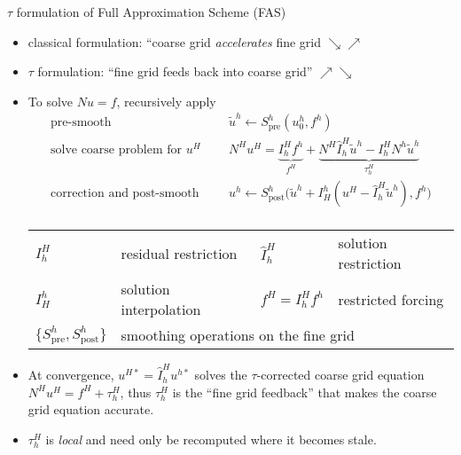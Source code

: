 \begin{frame}{$\tau$ formulation of Full Approximation Scheme (FAS)}
  \begin{itemize}
  \item classical formulation: ``coarse grid \emph{accelerates} fine grid $\searrow \nearrow$
  \item $\tau$ formulation: ``fine grid feeds back into coarse grid'' $\nearrow \searrow$
  \item To solve $N u = f$, recursively apply
    \begin{equation*}
      \begin{split}
        \text{pre-smooth} \:\: & \quad \tilde u^h \gets S^h_{\text{pre}}(u^h_0, f^h) \\
        \text{solve coarse problem for $u^H$} \:\: & \quad N^H u^H = \underbrace{I_h^H f^h}_{f^H} + \underbrace{N^H \hat I_h^H \tilde u^h - I_h^H N^h \tilde u^h}_{\tau_h^H} \\
        \text{correction and post-smooth} \:\: & \quad u^h \gets S^h_{\text{post}} \Big( \tilde u^h + I_H^h (u^H - \hat I_h^H \tilde u^h), f^h \Big) \\
      \end{split}
    \end{equation*}
    \begin{tabular}{llll}
      \toprule
      $I_h^H$ & residual restriction & $\hat I_h^H$ & solution restriction \\
      $I_H^h$ & solution interpolation & $f^H = I_h^H f^h$ & restricted forcing \\
      $\{S^h_{\text{pre}},S^h_{\text{post}}\}$ & \multicolumn{3}{l}{smoothing operations on the fine grid} \\
      \bottomrule
    \end{tabular}
  \item At convergence, $u^{H*} = \hat I_h^H u^{h*}$ solves the $\tau$-corrected coarse grid equation
    $N^H u^H = f^H + \tau_h^H$,
    thus $\tau_h^H$ is the ``fine grid feedback'' that makes the coarse grid equation accurate.
  \item $\tau_h^H$ is \emph{local} and need only be recomputed where it becomes stale.
  \end{itemize}
\end{frame}
